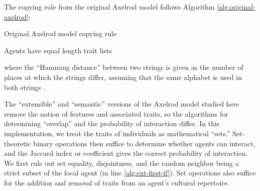 The copying rule from the original Axelrod model follows Algorithm \ref{alg:original-axelrod}:

\begin{algorithm}[H]
	\caption{Original Axelrod model copying rule}
	\label{alg:original-axelrod}
	\begin{boxedminipage}{\textwidth}
	\begin{algorithmic}[1]
		\REQUIRE Agents have equal length trait lists

		\ENDIF


	\end{algorithmic}
	\end{boxedminipage}
\end{algorithm}

where the ``Hamming distance'' between two strings is given as the number of places at which the strings differ, assuming that the same alphabet is used in both strings \citep{hamming1950error}.  

The ``extensible'' and ``semantic'' versions of the Axelrod model studied here remove the notion of features and associated traits, so the algorithms for determining ``overlap'' and the probability of interaction differ.  In this implementation, we treat the traits of individuals as mathematical ``sets.''  Set-theoretic binary operations then suffice to determine whether agents can interact, and the Jaccard index or coefficient gives the correct probability of interaction.  We first rule out set equality, disjointness, and the random neighbor being a strict subset of the focal agent (in line \ref{alg:ext-first-if}).  Set operations also suffice for the addition and removal of traits from an agent's cultural repertoire.  




